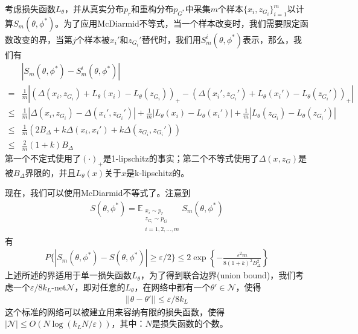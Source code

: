            \begin{Proof}
            考虑损失函数$L_\theta$，并从真实分布$p_r$和重构分布$p_{G^*}$中采集$m$个样本$\{x_i,z_{G_i}\}_{i=1}^m$以计算$S_m(\theta,\phi^*)$。为了应用McDiarmid不等式，当一个样本改变时，我们需要限定函数改变的界，当第$j$个样本被$x_i'$和$z_{G_i}'$替代时，我们用$S_m^i(\theta,\phi^*)$表示，那么，我们有
            \begin{align*}
            &|S_m(\theta,\phi^*) - S^i_m(\theta,\phi^*)|\\
            ={}&\frac{1}{m} |(\Delta(x_i,z_{G_i})+L_\theta(x_i) - L_\theta(z_{G_i}))_+ - (\Delta(x_i',z_{G_i}')+ L_\theta(x_i') - L_\theta(z_{G_i}'))_+|\\
            \leqslant{}&\frac{1}{m}|\Delta(x_i,z_{G_i})-\Delta(x_i',z_{G_i}')| + \frac{1}{m}|L_\theta(x_i) - L_\theta(x_i')  | + \frac{1}{m}|L_\theta(z_{G_i}) - L_\theta(z_{G_i}')| \\
            \leqslant {}&\frac{1}{m}(2B_\Delta+k\Delta(x_i,x_i')+k\Delta(z_{G_i},z_{G_i}'))\\
            \leqslant{}&\frac{2}{m}(1+k)B_\Delta
            \end{align*}
            第一个不定式使用了$(\cdot)_+$是1-lipschitz的事实；第二个不等式使用了$\Delta(x,z_G)$是被$B_\Delta$界限的，并且$L_\theta(x)$关于$x$是k-lipschitz的。
            \par
            现在，我们可以使用McDiarmid不等式了。注意到
            \begin{align*}
            S(\theta,\phi^*) = \mathbb{E}_{\substack{x_i\sim p_r\\z_{G_i}\sim p_G\\
            i=1,2,\dots,m}} S_m(\theta,\phi^*)
            \end{align*}
            有
            \begin{align*}
            P\{|S_m(\theta,\phi^*) - S(\theta,\phi^*)| \geqslant \varepsilon /2\} \leqslant 2\exp \left\{- \frac{\varepsilon^2m}{8(1+k)^2B_\Delta^2}  \right\}
            \end{align*}
            上述所述的界适用于单一损失函数$L_\theta$，为了得到联合边界(union bound)，我们考虑一个$\varepsilon/8k_L$-net$\mathcal{N}$，即对任意的$L_\theta$，在网络中都有一个$\theta'\in \mathcal{N}$，使得
            \begin{align*}
            ||\theta-\theta'|| \leqslant \varepsilon/8 k_L
            \end{align*}
            这个标准的网络可以被建立用来容纳有限的损失函数，使得$|\mathcal{N} |\leqslant O(N\log (k_LN/\varepsilon))$，其中：$N$是损失函数的个数。

\end{Proof}
